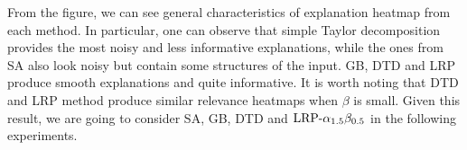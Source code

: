 From the figure, we can see general characteristics of explanation heatmap from each method. In particular, one can observe that simple Taylor decomposition provides the most noisy and less informative explanations, while the ones from SA also look noisy but contain some structures of the input. GB, DTD and LRP produce smooth explanations and quite informative. It is worth noting that DTD and LRP method produce similar relevance heatmaps when $\beta$ is small. Given this result, we are going to consider SA, GB, DTD and $\text{LRP-}\alpha_{1.5}\beta_{0.5}$ in the following experiments.